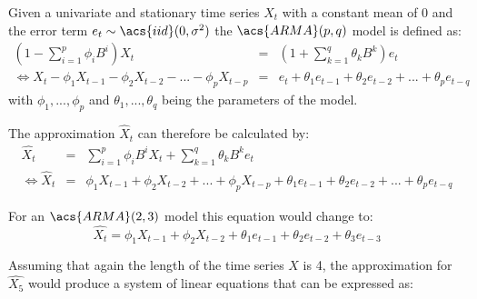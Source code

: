 \begin{definition}\label{def:arma}
    Given a univariate and stationary time series \(X_t\) with a constant mean of 0 and the error term $e_t \sim \acs{iid}(0, \sigma^2) $ the $\acs{ARMA}(p,q)$ model is defined as:\textsuperscript{\cite[p.~55]{Brockwell2002Introduction2nd}}
    \begin{equation}\label{eq:ARMA_p_q}
        \begin{array}{rcl}
            (1-\displaystyle\sum_{i=1}^{p} \phi_i B^i) X_t & = & (1+\displaystyle\sum_{k=1}^{q} \theta_k B^k)e_t\\
            
            \Leftrightarrow X_t - \phi_1 X_{t-1} - \phi_2 X_{t-2} - ... - \phi_p X_{t-p} & = & e_t + \theta_1 e_{t-1}+ \theta_2 e_{t-2}+ ... + \theta_p e_{t-q}
        \end{array}
    \end{equation}
    with $\phi_1, ..., \phi_p$ and $\theta_1, ..., \theta_q$ being the parameters of the model.
\end{definition}

The approximation $\hat{X}_t$ can therefore be calculated by:
\begin{equation}\label{eq:ARMA_hat_p_q}
    \begin{array}{rcl}
        \hat{X_t} &=& \displaystyle\sum_{i=1}^{p} \phi_i B^i X_t +\displaystyle\sum_{k=1}^{q} \theta_k B^k e_t\\
        
        \Leftrightarrow\hat{X}_t &=& \phi_1 X_{t-1} + \phi_2 X_{t-2} + ... + \phi_p X_{t-p} + \theta_1 e_{t-1}+ \theta_2 e_{t-2}+ ... + \theta_p e_{t-q}
    \end{array}
\end{equation}

For an $\acs{ARMA}(2,3)$ model this equation would change to:
\begin{equation}\label{eq:ARMA_hat_2_3}
    \hat{X_t} = \phi_1 X_{t-1} + \phi_2 X_{t-2} + \theta_1 e_{t-1} + \theta_2 e_{t-2}+ \theta_3 e_{t-3}
\end{equation}



Assuming that again the length of the time series $X$ is 4, the approximation for $\hat{X_5}$ would produce a system of linear equations that can be expressed as:

